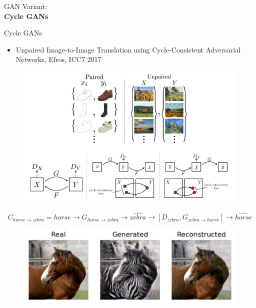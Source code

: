 \begin{frame}{}
    \LARGE GAN Variant: \\[1.5ex] \textbf{Cycle GANs}
\end{frame}


\begin{frame}[allowframebreaks]{Cycle GANs}

\begin{itemize}
    \item Unpaired Image-to-Image Translation using Cycle-Consistent Adversarial Networks, Efros, ICC7 2017
    
\end{itemize}
\begin{figure}
    \centering
    \includegraphics[height=0.7\textheight, width=\textwidth, keepaspectratio]{images/gan/cycle_gan_1.png}
\end{figure}
\framebreak
$$C_{horse \rightarrow zebra} = horse \rightarrow G_{horse \rightarrow zebra} \rightarrow \hat{zebra} \rightarrow [D_{zebra}, G_{zebra \rightarrow horse}] \rightarrow \hat{horse}$$
\begin{figure}
    \centering
    \includegraphics[height=0.7\textheight, width=\textwidth, keepaspectratio]{images/gan/cycle_gan_2.png}
\end{figure}


\end{frame}
